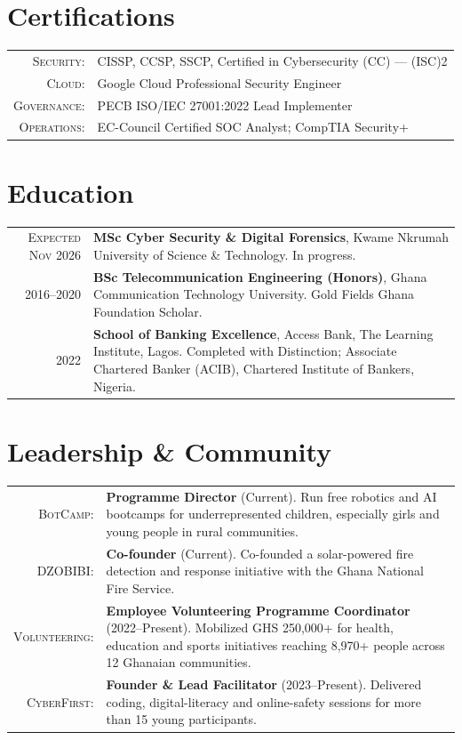 \documentclass[a4paper,11pt]{article}
\begin{document}
\section{Certifications}
\begin{tabular}{r p{}}
\textsc{Security:} & CISSP, CCSP, SSCP, Certified in Cybersecurity (CC) --- (ISC)2\\[3pt]
\textsc{Cloud:} & Google Cloud Professional Security Engineer\\[3pt]
\textsc{Governance:} & PECB ISO/IEC 27001:2022 Lead Implementer\\[3pt]
\textsc{Operations:} & EC-Council Certified SOC Analyst; CompTIA Security+\\[3pt]
\end{tabular}
\section{Education}
\begin{tabular}{r p{}}
\textsc{Expected Nov 2026} & \textbf{MSc Cyber Security \& Digital Forensics}, Kwame Nkrumah University of Science \& Technology. In progress.\\[4pt]
\textsc{2016--2020} & \textbf{BSc Telecommunication Engineering (Honors)}, Ghana Communication Technology University. Gold Fields Ghana Foundation Scholar.\\[4pt]
\textsc{2022} & \textbf{School of Banking Excellence}, Access Bank, The Learning Institute, Lagos. Completed with Distinction; Associate Chartered Banker (ACIB), Chartered Institute of Bankers, Nigeria.\\[4pt]
\end{tabular}
\section{Leadership \& Community}
\begin{tabular}{r p{}}
\textsc{BotCamp:} & \textbf{Programme Director} (Current). Run free robotics and AI bootcamps for underrepresented children, especially girls and young people in rural communities.\\[4pt]
\textsc{DZOBIBI:} & \textbf{Co-founder} (Current). Co-founded a solar-powered fire detection and response initiative with the Ghana National Fire Service.\\[4pt]
\textsc{Volunteering:} & \textbf{Employee Volunteering Programme Coordinator} (2022--Present). Mobilized GHS 250,000+ for health, education and sports initiatives reaching 8,970+ people across 12 Ghanaian communities.\\[4pt]
\textsc{CyberFirst:} & \textbf{Founder \& Lead Facilitator} (2023--Present). Delivered coding, digital-literacy and online-safety sessions for more than 15 young participants.\\[4pt]
\end{tabular}
\endgroup
\end{document}
